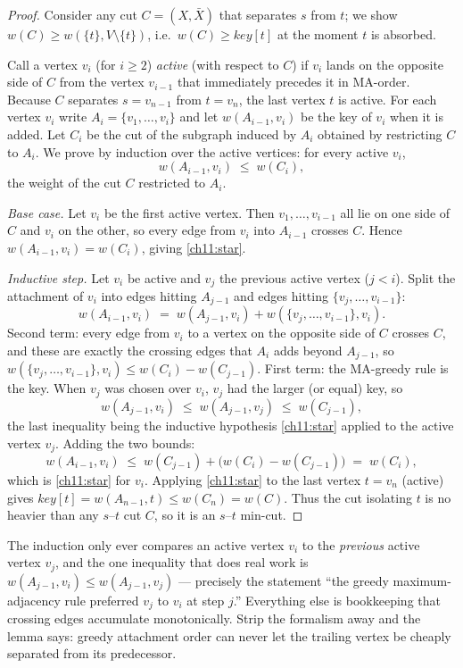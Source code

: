 \begin{proof}
Consider any cut $C=(X,\bar X)$ that separates $s$ from $t$; we show $w(C)\ge w(\{t\},V\setminus\{t\})$, i.e.\ $w(C)\ge \textit{key}[t]$ at the moment $t$ is absorbed.

Call a vertex $v_i$ (for $i\ge 2$) \emph{active} (with respect to $C$) if $v_i$ lands on the opposite side of $C$ from the vertex $v_{i-1}$ that immediately precedes it in MA-order. Because $C$ separates $s=v_{n-1}$ from $t=v_n$, the last vertex $t$ is active. For each vertex $v_i$ write $A_i = \{v_1,\dots,v_i\}$ and let $w(A_{i-1}, v_i)$ be the key of $v_i$ when it is added. Let $C_i$ be the cut of the subgraph induced by $A_i$ obtained by restricting $C$ to $A_i$. We prove by induction over the active vertices: for every active $v_i$,
\[
  w(A_{i-1}, v_i) \;\le\; w(C_i),
\tag{$\star$}\label{ch11:star}
\]
the weight of the cut $C$ restricted to $A_i$.

\emph{Base case.} Let $v_i$ be the first active vertex. Then $v_1,\dots,v_{i-1}$ all lie on one side of $C$ and $v_i$ on the other, so every edge from $v_i$ into $A_{i-1}$ crosses $C$. Hence $w(A_{i-1},v_i)=w(C_i)$, giving \eqref{ch11:star}.

\emph{Inductive step.} Let $v_i$ be active and $v_j$ the previous active vertex ($j<i$). Split the attachment of $v_i$ into edges hitting $A_{j-1}$ and edges hitting $\{v_j,\dots,v_{i-1}\}$:
\[
  w(A_{i-1}, v_i) \;=\; w(A_{j-1}, v_i) + w(\{v_j,\dots,v_{i-1}\}, v_i).
\]
Second term: every edge from $v_i$ to a vertex on the opposite side of $C$ crosses $C$, and these are exactly the crossing edges that $A_i$ adds beyond $A_{j-1}$, so $w(\{v_j,\dots,v_{i-1}\}, v_i)\le w(C_i)-w(C_{j-1})$. First term: the MA-greedy rule is the key. When $v_j$ was chosen over $v_i$, $v_j$ had the larger (or equal) key, so
\[
  w(A_{j-1}, v_i) \;\le\; w(A_{j-1}, v_j) \;\le\; w(C_{j-1}),
\]
the last inequality being the inductive hypothesis \eqref{ch11:star} applied to the active vertex $v_j$. Adding the two bounds:
\[
  w(A_{i-1}, v_i) \;\le\; w(C_{j-1}) + \big(w(C_i)-w(C_{j-1})\big) \;=\; w(C_i),
\]
which is \eqref{ch11:star} for $v_i$. Applying \eqref{ch11:star} to the last vertex $t=v_n$ (active) gives $\textit{key}[t]=w(A_{n-1},t)\le w(C_n)=w(C)$. Thus the cut isolating $t$ is no heavier than any $s$--$t$ cut $C$, so it is an $s$--$t$ min-cut.
\end{proof}

\begin{whybox}
The induction only ever compares an active vertex $v_i$ to the \emph{previous} active vertex $v_j$, and the one inequality that does real work is $w(A_{j-1},v_i)\le w(A_{j-1},v_j)$ --- precisely the statement ``the greedy maximum-adjacency rule preferred $v_j$ to $v_i$ at step $j$.'' Everything else is bookkeeping that crossing edges accumulate monotonically. Strip the formalism away and the lemma says: greedy attachment order can never let the trailing vertex be cheaply separated from its predecessor.
\end{whybox}

